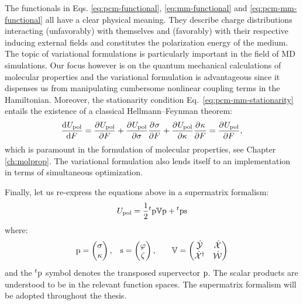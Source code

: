 The functionals in Eqs. \eqref{eq:pcm-functional},
\eqref{eq:mm-functional} and \eqref{eq:pcm-mm-functional} all have a
clear physical meaning.
They describe charge distributions interacting (unfavorably) with
themselves and (favorably) with their respective inducing external
fields and constitutes the polarization energy of the medium.
The topic of variational formulations is particularly important in the
field of \acrshort{MD} simulations.\autocite{Jadhao2012-gf, Jadhao2013-ry, Jadhao2013-hs,
Solis2013-ef}
Our focus however is on the quantum mechanical calculations of molecular
properties and the variational formulation is advantageous since it
dispenses us from manipulating cumbersome nonlinear coupling terms in
the Hamiltonian.
Moreover, the stationarity condition Eq.~\ref{eq:pcm-mm-stationarity}
entails the existence of a classical Hellmann--Feynman theorem:
\begin{equation}\label{eq:classical-HF}
  \frac{\mathop{}\!\mathrm{d}^{}U_\mathrm{pol}}{\mathop{}\!\mathrm{d} F^{}} = \frac{\partial^{}U_\mathrm{pol}} {\partial F^{}}
  + \frac{\partial^{}U_\mathrm{pol}} {\partial \sigma^{}}\frac{\partial^{}\sigma} {\partial F^{}}
  + \frac{\partial^{}U_\mathrm{pol}} {\partial \kappa^{}}\frac{\partial^{}\kappa} {\partial F^{}}
  = \frac{\partial^{}U_\mathrm{pol}} {\partial F^{}},
\end{equation}
which is paramount in the formulation of molecular properties, see
Chapter \ref{ch:molprop}.
The variational formulation also lends itself to an implementation
in terms of simultaneous optimization.\autocite{Lipparini2011-aj}

Finally, let us re-express the equations above in a supermatrix
formalism:
\begin{equation}\label{eq:supermatrix-functional}
  U_\mathrm{pol} =
  \frac{1}{2}{}^t\mathrm{p}\mathbb{V}\mathrm{p} + {}^t\mathrm{p}\mathrm{s}
\end{equation}
where:
\begin{alignat}{3}
  \mathrm{p} =
  \begin{pmatrix}
    \sigma \\
    \kappa
  \end{pmatrix},
  \quad&
  \mathrm{s} =
  \begin{pmatrix}
   \varphi \\
   \zeta
  \end{pmatrix},
  \quad&
  \mathbb{V} =
  \begin{pmatrix}
    \hat{\mathcal{Y}} & \hat{\mathcal{X}} \\
    \hat{\mathcal{X}}^\dagger & \hat{\mathcal{W}}
  \end{pmatrix}
\end{alignat}
and the ${}^t\mathrm{p}$ symbol denotes the transposed supervector $\mathrm{p}$.
The scalar products are understood to be in the relevant function
spaces.
The supermatrix formalism will be adopted throughout the thesis.

